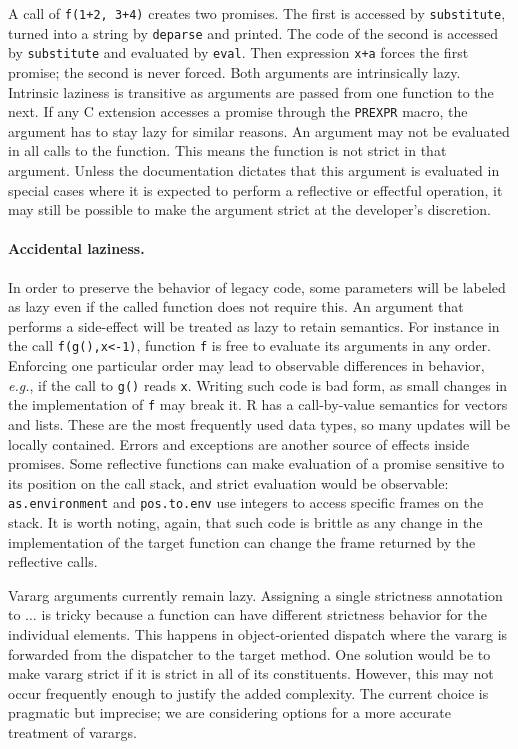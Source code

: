 \documentclass[review,creen,acmsmall]{acmart}
\newcommand{\code}[1]{\lstinline |#1|\xspace}
\renewcommand{\c}[1]{\lstinline |#1|\xspace}
\newcommand{\eg}{\emph{e.g.},\xspace}
\begin{document}
\medskip
\noindent
A call of \c{f(1+2, 3+4)} creates two promises. The first is accessed by
\c{substitute}, turned into a string by \c{deparse} and printed. The code of the
second is accessed by \c{substitute} and evaluated by \c{eval}. Then expression
\c{x+a} forces the first promise; the second is never forced. Both arguments are
intrinsically lazy. Intrinsic laziness is transitive as arguments are passed
from one function to the next. If any C extension accesses a promise through the
\code{PREXPR} macro, the argument has to stay lazy for similar reasons. An
argument may not be evaluated in all calls to the function. This means the
function is not strict in that argument. Unless the documentation dictates that
this argument is evaluated in special cases where it is expected to perform a
reflective or effectful operation, it may still be possible to make the argument
strict at the developer's discretion.

\paragraph{Accidental laziness.} In order to preserve the behavior of legacy
code, some parameters will be labeled as lazy even if the called function does
not require this. An argument that performs a side-effect will be treated as
lazy to retain semantics. For instance in the call \c{f(g(),x<-1)}, function \c
f is free to evaluate its arguments in any order. Enforcing one particular order
may lead to observable differences in behavior, \eg if the call to \c{g()} reads
\c{x}. Writing such code is bad form, as small changes in the implementation of
\c f may break it. R has a call-by-value semantics for vectors and lists. These
are the most frequently used data types, so many updates will be locally
contained. Errors and exceptions are another source of effects inside promises.
Some reflective functions can make evaluation of a promise sensitive to its
position on the call stack, and strict evaluation would be observable:
\code{as.environment} and \code{pos.to.env} use integers to access specific
frames on the stack. It is worth noting, again, that such code is brittle as any
change in the implementation of the target function can change the frame
returned by the reflective calls.

Vararg arguments currently remain lazy. Assigning a single strictness annotation
to $\dots$ is tricky because a function can have different strictness behavior
for the individual elements. This happens in object-oriented dispatch where the
vararg is forwarded from the dispatcher to the target method. One solution would
be to make vararg strict if it is strict in all of its constituents. However,
this may not occur frequently enough to justify the added complexity. The
current choice is pragmatic but imprecise; we are considering options for a more
accurate treatment of varargs.
\end{document}
